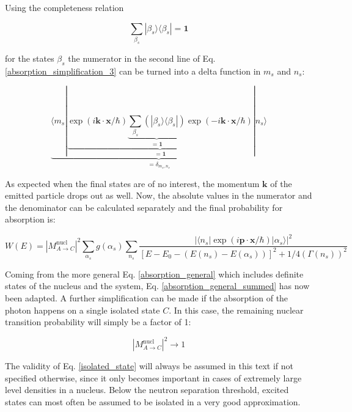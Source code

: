 \documentclass{article}
\begin{document}
Using the completeness relation

\begin{equation}
	\label{completeness_relation_system}
	\sum_{\beta_s} | \beta_s \rangle \langle \beta_s | = \mathbf{1} 
\end{equation}

for the states $\beta_s$ the numerator in the second line of Eq. \ref{absorption_simplification_3} can be turned into a delta function in $m_s$ and $n_s$:

\begin{equation}
	\label{absorption_simplification_4}
	\underbrace{\langle m_s | \underbrace{\exp{\left( i \mathbf{k} \cdot \mathbf{x} / \hbar \right)} \underbrace{\sum_{\beta_s} \left( | \beta_s \rangle \langle \beta_s | \right)}_{ = \mathbf{1}} \exp{\left( - i \mathbf{k} \cdot \mathbf{x} / \hbar \right)} }_{ = \mathbf{1}} | n_s \rangle }_{ = \delta_{m_s, n_s}}
\end{equation}

As expected when the final states are of no interest, the momentum $\mathbf{k}$ of the emitted particle drops out as well. 
Now, the absolute values in the numerator and the denominator can be calculated separately and the final probability for absorption is:

\begin{equation}
\label{absorption_general_summed}
	W(E) = \left| M^{\mathrm{nucl}}_{A \to C} \right|^2 \sum_{\alpha_s} g(\alpha_s) \sum_{n_s} \frac{ \left| \langle n_s | \exp{\left( i \mathbf{p} \cdot \mathbf{x} / \hbar \right)} | \alpha_s \rangle \right|^2  }{\left[ E - E_0 - \left( E(n_s) - E(\alpha_s) \right) \right]^2 + 1/4 \left( \Gamma(n_s) \right)^2 }
\end{equation}

Coming from the more general Eq. \ref{absorption_general} which includes definite states of the nucleus and the system, Eq. \ref{absorption_general_summed} has now been adapted.
A further simplification can be made if the absorption of the photon happens on a single isolated state $C$.
In this case, the remaining nuclear transition probability will simply be a factor of 1:

\begin{equation}
	\label{isolated_state}
\left| M^{\mathrm{nucl}}_{A \to C} \right|^2 \to 1
\end{equation}

The validity of Eq. \ref{isolated_state} will always be assumed in this text if not specified otherwise, since it only becomes important in cases of extremely large level densities in a nucleus. Below the neutron separation threshold, excited states can most often be assumed to be isolated in a very good approximation.
\end{document}
